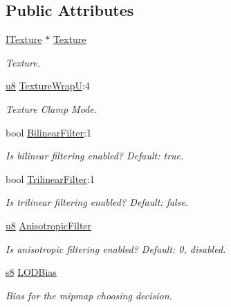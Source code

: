 \subsection*{Public Attributes}
\begin{DoxyCompactItemize}
\item 
\mbox{\label{classirr_1_1video_1_1SMaterialLayer_aee7162444c5ed350375c7a46e1bbe450}} 
\hyperlink{classirr_1_1video_1_1ITexture}{I\+Texture} $\ast$ \hyperlink{classirr_1_1video_1_1SMaterialLayer_aee7162444c5ed350375c7a46e1bbe450}{Texture}
\begin{DoxyCompactList}\small\item\em Texture. \end{DoxyCompactList}\item 
\hyperlink{namespaceirr_a646874f69af8ff87fc10201b0254a761}{u8} \hyperlink{classirr_1_1video_1_1SMaterialLayer_afb8408075afd8e84c8ff7c46f7a899bb}{Texture\+WrapU}\+:4
\begin{DoxyCompactList}\small\item\em Texture Clamp Mode. \end{DoxyCompactList}\item 
\mbox{\label{classirr_1_1video_1_1SMaterialLayer_a72b122a636971204922d399ec6c0e8ac}} 
bool \hyperlink{classirr_1_1video_1_1SMaterialLayer_a72b122a636971204922d399ec6c0e8ac}{Bilinear\+Filter}\+:1
\begin{DoxyCompactList}\small\item\em Is bilinear filtering enabled? Default\+: true. \end{DoxyCompactList}\item 
bool \hyperlink{classirr_1_1video_1_1SMaterialLayer_ad1b093b1a8e26cb10156a02ac78bdf67}{Trilinear\+Filter}\+:1
\begin{DoxyCompactList}\small\item\em Is trilinear filtering enabled? Default\+: false. \end{DoxyCompactList}\item 
\hyperlink{namespaceirr_a646874f69af8ff87fc10201b0254a761}{u8} \hyperlink{classirr_1_1video_1_1SMaterialLayer_aed142b316a920ec8fc5e0df09d3de3eb}{Anisotropic\+Filter}
\begin{DoxyCompactList}\small\item\em Is anisotropic filtering enabled? Default\+: 0, disabled. \end{DoxyCompactList}\item 
\hyperlink{namespaceirr_adc3ec66d7537550be0fea1c9eeadd63d}{s8} \hyperlink{classirr_1_1video_1_1SMaterialLayer_a5d1ac213ab5b7bcab23464eefd102b53}{L\+O\+D\+Bias}
\begin{DoxyCompactList}\small\item\em Bias for the mipmap choosing decision. \end{DoxyCompactList}\end{DoxyCompactItemize}


